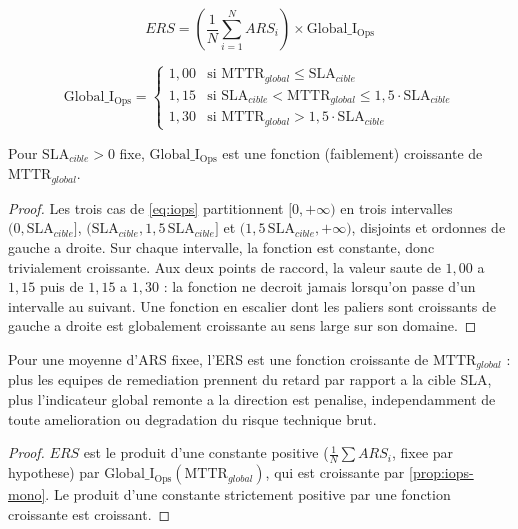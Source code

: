 \begin{equation}
ERS = \left(\frac{1}{N}\sum_{i=1}^{N} ARS_i \right) \times \mathrm{Global\_I_{Ops}}
\label{eq:ers}
\end{equation}

\begin{equation}
\mathrm{Global\_I_{Ops}} =
\begin{cases}
1{,}00 & \text{si } \mathrm{MTTR}_{global} \le \mathrm{SLA}_{cible} \\
1{,}15 & \text{si } \mathrm{SLA}_{cible} < \mathrm{MTTR}_{global} \le 1{,}5\cdot \mathrm{SLA}_{cible} \\
1{,}30 & \text{si } \mathrm{MTTR}_{global} > 1{,}5\cdot \mathrm{SLA}_{cible}
\end{cases}
\label{eq:iops}
\end{equation}

\begin{propriete}
\label{prop:iops-mono}
Pour $\mathrm{SLA}_{cible}>0$ fixe, $\mathrm{Global\_I_{Ops}}$ est une fonction
(faiblement) croissante de $\mathrm{MTTR}_{global}$.
\end{propriete}

\begin{proof}
Les trois cas de \cref{eq:iops} partitionnent $[0,+\infty)$ en trois intervalles
$\big(0,\mathrm{SLA}_{cible}\big]$, $\big(\mathrm{SLA}_{cible},1{,}5\,
\mathrm{SLA}_{cible}\big]$ et $\big(1{,}5\,\mathrm{SLA}_{cible},+\infty\big)$,
disjoints et ordonnes de gauche a droite. Sur chaque intervalle, la fonction est
constante, donc trivialement croissante. Aux deux points de raccord, la valeur
saute de $1{,}00$ a $1{,}15$ puis de $1{,}15$ a $1{,}30$ : la fonction ne decroit
jamais lorsqu'on passe d'un intervalle au suivant. Une fonction en escalier dont les
paliers sont croissants de gauche a droite est globalement croissante au sens large
sur son domaine.
\end{proof}

\begin{corollaire}
Pour une moyenne d'ARS fixee, l'ERS est une fonction croissante de
$\mathrm{MTTR}_{global}$ : plus les equipes de remediation prennent du retard par
rapport a la cible SLA, plus l'indicateur global remonte a la direction est penalise,
independamment de toute amelioration ou degradation du risque technique brut.
\end{corollaire}

\begin{proof}
$ERS$ est le produit d'une constante positive ($\frac{1}{N}\sum ARS_i$, fixee par
hypothese) par $\mathrm{Global\_I_{Ops}}(\mathrm{MTTR}_{global})$, qui est croissante
par \cref{prop:iops-mono}. Le produit d'une constante strictement positive par une
fonction croissante est croissant.
\end{proof}

